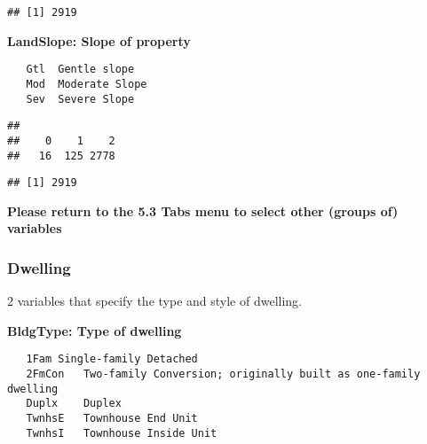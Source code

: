\documentclass[]{article}
\newenvironment{Shaded}{\begin{snugshade}}{\end{snugshade}}
\newcommand{\KeywordTok}[1]{\textcolor[rgb]{0.13,0.29,0.53}{\textbf{#1}}}
\newcommand{\DecValTok}[1]{\textcolor[rgb]{0.00,0.00,0.81}{#1}}
\newcommand{\StringTok}[1]{\textcolor[rgb]{0.31,0.60,0.02}{#1}}
\newcommand{\CommentTok}[1]{\textcolor[rgb]{0.56,0.35,0.01}{\textit{#1}}}
\newcommand{\OperatorTok}[1]{\textcolor[rgb]{0.81,0.36,0.00}{\textbf{#1}}}
\newcommand{\NormalTok}[1]{#1}
\begin{document}
\begin{verbatim}
## [1] 2919
\end{verbatim}

\textbf{LandSlope: Slope of property}

\begin{verbatim}
   Gtl  Gentle slope
   Mod  Moderate Slope  
   Sev  Severe Slope
\end{verbatim}

\begin{Shaded}
\end{Shaded}

\begin{verbatim}
## 
##    0    1    2 
##   16  125 2778
\end{verbatim}

\begin{Shaded}
\end{Shaded}

\begin{verbatim}
## [1] 2919
\end{verbatim}

\textbf{Please return to the 5.3 Tabs menu to select other (groups of)
variables}

\subsubsection{Dwelling}\label{dwelling}

2 variables that specify the type and style of dwelling.

\textbf{BldgType: Type of dwelling}

\begin{verbatim}
   1Fam Single-family Detached  
   2FmCon   Two-family Conversion; originally built as one-family dwelling
   Duplx    Duplex
   TwnhsE   Townhouse End Unit
   TwnhsI   Townhouse Inside Unit
\end{verbatim}
\end{document}
